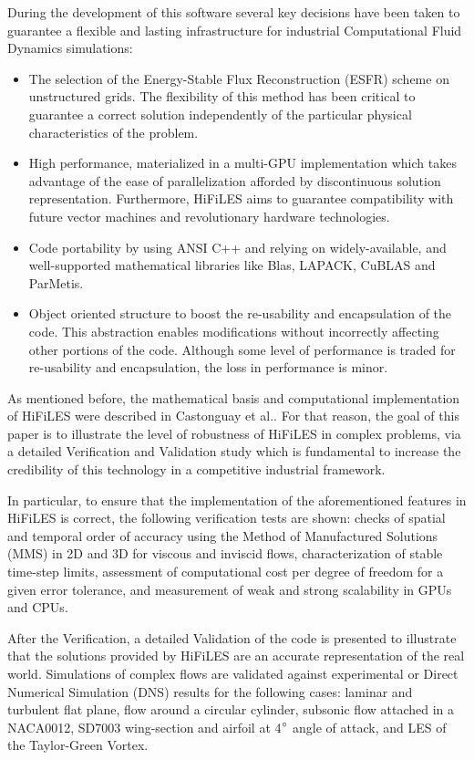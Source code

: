 During the development of this software several key decisions have been taken to guarantee a flexible and lasting infrastructure for industrial Computational Fluid Dynamics simulations:
\begin{itemize}
\item The selection of the Energy-Stable Flux Reconstruction (ESFR) scheme on unstructured grids. The flexibility of this method has been critical to guarantee a correct solution independently of the particular physical characteristics of the problem.
\item High performance, materialized in a multi-GPU implementation which takes advantage of the ease of parallelization afforded by discontinuous solution representation. Furthermore, HiFiLES aims to guarantee compatibility with future vector machines and revolutionary hardware technologies.
\item Code portability by using ANSI C++ and relying on widely-available, and well-supported mathematical libraries like Blas, LAPACK, CuBLAS and ParMetis.
\item Object oriented structure to boost the re-usability and encapsulation of the code. This abstraction enables modifications without incorrectly affecting other portions of the code. Although some level of performance is traded for re-usability and encapsulation, the loss in performance is minor.
\end{itemize}

As mentioned before, the mathematical basis and computational implementation of HiFiLES were described in Castonguay et al.\cite{castonguay2011}. For that reason, the goal of this paper is to illustrate the level of robustness of HiFiLES in complex problems, via a detailed Verification and Validation study which is fundamental to increase the credibility of this technology in a competitive industrial framework.

In particular, to ensure that the implementation of the aforementioned features in HiFiLES is correct, the following verification tests are shown: checks of spatial and temporal order of accuracy using the Method of Manufactured Solutions (MMS) in 2D and 3D for viscous and inviscid flows, characterization of stable time-step limits, assessment of computational cost per degree of freedom for a given error tolerance, and measurement of weak and strong scalability in GPUs and CPUs. 

After the Verification, a detailed Validation of the code is presented to illustrate that the solutions provided by HiFiLES are an accurate representation of the real world. Simulations of complex flows are validated against experimental or Direct Numerical Simulation (DNS) results for the following cases: laminar and turbulent flat plane, flow around a circular cylinder, subsonic flow attached in a NACA0012, SD7003 wing-section and airfoil at 4$^{\circ}$ angle of attack, and LES of the Taylor-Green Vortex.

